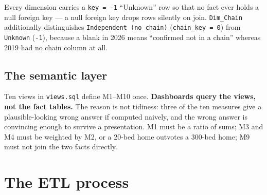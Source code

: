 \documentclass[11pt,a4paper]{article}
\newcommand{\code}[1]{\texttt{#1}}
\begin{document}
Every dimension carries a \code{key = -1} ``Unknown'' row so that no fact ever
holds a null foreign key — a null foreign key drops rows silently on join.
\code{Dim\_Chain} additionally distinguishes \code{Independent (no chain)}
(\code{chain\_key = 0}) from \code{Unknown} (\code{-1}), because a blank in 2026
means ``confirmed not in a chain'' whereas 2019 had no chain column at all.

\subsection{The semantic layer}

Ten views in \code{views.sql} define M1--M10 once. \textbf{Dashboards query the
views, not the fact tables.} The reason is not tidiness: three of the ten
measures give a plausible-looking wrong answer if computed naively, and the
wrong answer is convincing enough to survive a presentation. M1 must be a ratio
of sums; M3 and M4 must be weighted by M2, or a 20-bed home outvotes a 300-bed
home; M9 must not join the two facts directly.

\section{The ETL process}
\end{document}

